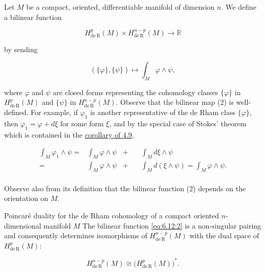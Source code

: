 \label{thm:6.12} Let $M$ be a compact, oriented, differentiable manifold of dimension $n$. We define a bilinear function

\begin{equation}
\tag{1}\label{eq:6.12:1}
H_{\mathrm{de\,R}}^{p}(M)\times H_{\mathrm{de\,R}}^{n-p}(M)\to\mathbb{R}
\end{equation}

by sending

\begin{equation}
\tag{2}\label{eq:6.12:2}
\left(\{\varphi\},\{\psi\}\right)\mapsto\int_{M}\varphi\wedge\psi,
\end{equation}

where $\varphi$ and $\psi$ are closed forms representing the cohomology classes $\{\varphi\}$ in $H_{\mathrm{de\,R}}^{p}(M)$ and $\{\psi\}$ in $H_{\mathrm{de\,R}}^{n-p}(M)$. Observe that the bilinear map (2) is well-defined. For example, if $\varphi_{1}$ is another representative of the de Rham class $\{\varphi\}$, then $\varphi_{1}=\varphi+d\xi$ for some form $\xi$, and by the special case of Stokes' theorem which is contained in the \hyperref[thm:4.9]{corollary of 4.9},

\begin{equation}
\tag{3}\label{eq:6.12:3}
\begin{aligned}{\int_{M}\varphi_{1}\wedge\psi=}&{{}\int_{M}\varphi\wedge\psi}&{+}&{{}\quad\int_{M}d\xi\wedge\psi}\\ {=}&{{}\int_{M}\varphi\wedge\psi}&{+}&{{}\quad\int_{M}d(\xi\wedge\psi)=\int_{M}\varphi\wedge\psi.}\\ \end{aligned}
\end{equation}

Observe also from its definition that the bilinear function (2) depends on the orientation on $M$.

\begin{theorem}{Poincaré duality for the de Rham cohomology of a compact oriented $n$-dimensional manifold $M$}\label{thm:6.13}
The bilinear function \eqref{eq:6.12:2} is a non-singular pairing and consequently determines isomorphisms of $H_{\mathrm{de\,R}}^{n-p}(M)$ with the dual space of $H_{\mathrm{de\,R}}^{p}(M)$: 

\begin{equation}
\tag{1}\label{eq:6.13:1}
H_{\mathrm{de\,R}}^{n-p}(M)\cong\big(H_{\mathrm{de\,R}}^{p}(M)\big)^{*}.
\end{equation}

\end{theorem}

